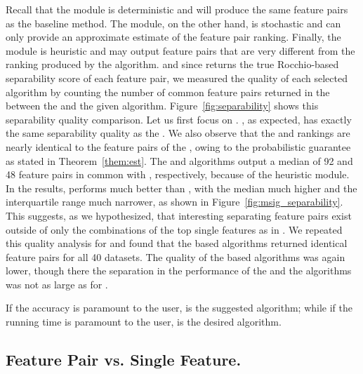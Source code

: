   Recall that the \earlyT module is deterministic and will produce the same \topk feature pairs as the baseline method. The \sampling module, on the other hand, is stochastic and can only provide an approximate estimate of the \topk feature pair ranking. Finally, the \traversal module is heuristic and may output \topk feature pairs that are very different from the ranking produced by the \baseline algorithm. 
and since \baseline returns the true Rocchio-based separability score of each feature pair, we measured the quality of each selected algorithm by counting the number of common feature pairs returned in the \tophundred between the \baseline and the given algorithm. Figure~\ref{fig:separability} shows this separability quality comparison. Let us first focus on \msig. \earlyOrder, as expected, has exactly the same separability quality as the \baseline. We also observe that the \samp and \sampOpt rankings are nearly identical to the \tophundred feature pairs of the \baseline, owing to the probabilistic guarantee as stated in Theorem~\ref{them:est}. The \horiz and \vertic algorithms output a median of 92 and 48 feature pairs in common with \baseline, respectively, because of the heuristic \traversal module. In the \msig results, \horiz performs much better than \vertic, with the median much higher and the interquartile range much narrower, as shown in Figure~\ref{fig:msig_separability}. This suggests, as we hypothesized, that interesting separating feature pairs exist outside of only the combinations of the top single features as in \vertic. We repeated this quality analysis for  \lincs and found that the \sampling based algorithms returned identical \tophundred feature pairs for all 40 datasets. The quality of the \traversal based algorithms was again lower, though there the separation in the performance of the \horiz and the \vertic algorithms was not as large as for \msig.

 If the accuracy is paramount to the user, 
\sampOpt is the suggested algorithm; while if the running time is paramount to the user, \horiz is the desired algorithm.


\subsection{Feature Pair vs. Single Feature.}\label{sec:FPvSF}

